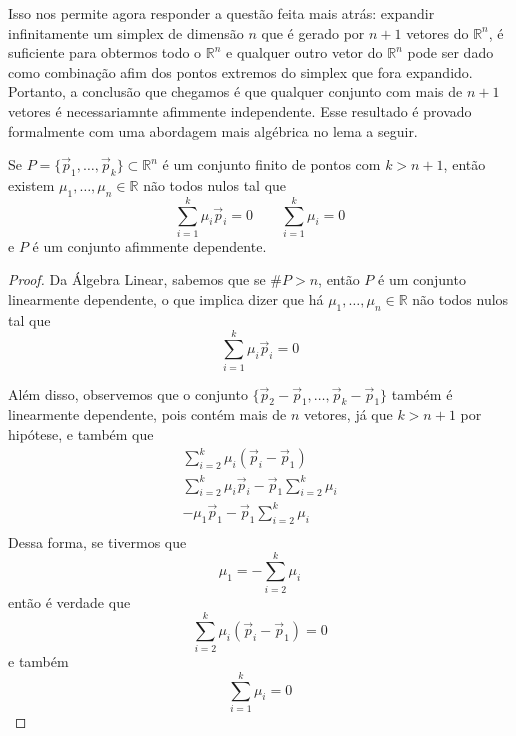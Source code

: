 Isso nos permite agora responder a questão feita mais atrás:
expandir infinitamente um simplex de dimensão $n$ que é gerado
por $n+1$ vetores do  $\mathbb{R}^n$, é suficiente para obtermos todo o
$\mathbb{R}^n$ e qualquer outro vetor do $\mathbb{R}^n$ pode ser dado como
combinação afim dos pontos extremos do simplex que fora expandido.
Portanto, a conclusão que chegamos é que qualquer conjunto com mais
de $n+1$ vetores é necessariamnte afimmente independente. Esse resultado
é provado formalmente com uma abordagem mais algébrica no lema a seguir.

\begin{lemma:afim}
	\label{lemma:afim}
	Se $P = \{\vec p_1, \ldots, \vec p_k\} \subset \mathbb{R}^n$ é um conjunto
	finito de pontos com $k > n + 1$, então existem $\mu_1, \ldots, \mu_n
	\in \mathbb{R}$ não todos nulos tal que
	\begin{equation*}
		\displaystyle\sum_{i=1}^k \mu_i \vec p_i = 0 \quad\quad \displaystyle\sum_{i=1}^k \mu_i = 0
	\end{equation*}
	e $P$ é um conjunto afimmente dependente.

	\begin{proof}
		Da Álgebra Linear, sabemos que se $\#P > n$, então $P$ é um conjunto
		linearmente dependente, o que implica dizer que há $\mu_1, \ldots, \mu_n
		\in \mathbb{R}$ não todos nulos tal que
		\[\displaystyle\sum_{i=1}^k \mu_i \vec p_i = 0\]

		Além disso, observemos que o conjunto $\{\vec p_2 - \vec p_1, \ldots, \vec p_k - \vec p_1\}$
		também é linearmente dependente, pois contém mais de $n$ vetores,
		já que $k > n + 1$ por hipótese,
		e também que
		\begin{gather*}
		  \sum_{i=2}^{k} \mu_i (\vec p_i - \vec p_1) \\
		  \sum_{i=2}^{k} \mu_i \vec p_i - \vec p_1 \sum_{i=2}^{k} \mu_i \\
		  - \mu_1 \vec p_1 - \vec p_1 \sum_{i=2}^{k} \mu_i \\
		\end{gather*}
		Dessa forma, se tivermos que
		\[
		  \mu_1 = - \sum_{i=2}^{k} \mu_i
		\]
		então é verdade que
		\[
		  \sum_{i=2}^{k} \mu_i (\vec p_i - \vec p_1) = 0
		\]
		e também
		\[
		  \sum_{i=1}^{k} \mu_i = 0
		\]


\end{proof}
\end{lemma:afim}
